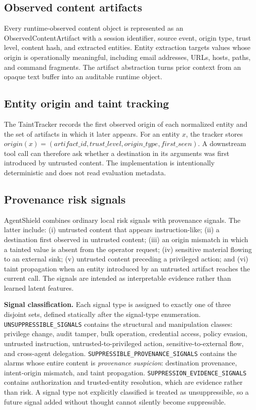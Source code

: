 \documentclass[letterpaper,twocolumn,10pt]{article}
\begin{document}
\subsection{Observed content artifacts}
\label{sec:artifacts}

Every runtime-observed content object is represented as an
ObservedContentArtifact with a session identifier, source event, origin type,
trust level, content hash, and extracted entities. Entity extraction targets
values whose origin is operationally meaningful, including email addresses,
URLs, hosts, paths, and command fragments. The artifact abstraction turns prior
context from an opaque text buffer into an auditable runtime object.

\subsection{Entity origin and taint tracking}
\label{sec:taint}

The TaintTracker records the first observed origin of each normalized entity
and the set of artifacts in which it later appears. For an entity $x$, the
tracker stores $origin(x) = (artifact\_id, trust\_level, origin\_type,
first\_seen)$. A downstream tool call can therefore ask whether a destination
in its arguments was first introduced by untrusted content. The implementation
is intentionally deterministic and does not read evaluation metadata.

\subsection{Provenance risk signals}
\label{sec:signals}

AgentShield combines ordinary local risk signals with provenance signals. The
latter include: (i) untrusted content that appears instruction-like; (ii) a
destination first observed in untrusted content; (iii) an origin mismatch in
which a tainted value is absent from the operator request; (iv) sensitive
material flowing to an external sink; (v) untrusted content preceding a
privileged action; and (vi) taint propagation when an entity introduced by an
untrusted artifact reaches the current call. The signals are intended as
interpretable evidence rather than learned latent features.

\noindent\textbf{Signal classification.} Each signal type is assigned to
exactly one of three disjoint sets, defined statically after the signal-type
enumeration. \texttt{UNSUPPRESSIBLE\_SIGNALS} contains the structural and
manipulation classes: privilege change, audit tamper, bulk operation,
credential access, policy evasion, untrusted instruction,
untrusted-to-privileged action, sensitive-to-external flow, and cross-agent
delegation. \texttt{SUPPRESSIBLE\_PROVENANCE\_SIGNALS} contains the alarms whose
entire content is \emph{provenance suspicion}: destination provenance,
intent-origin mismatch, and taint propagation.
\texttt{SUPPRESSION\_EVIDENCE\_SIGNALS} contains authorization and
trusted-entity resolution, which are evidence rather than risk. A signal type
not explicitly classified is treated as unsuppressible, so a future signal
added without thought cannot silently become suppressible.
\end{document}
